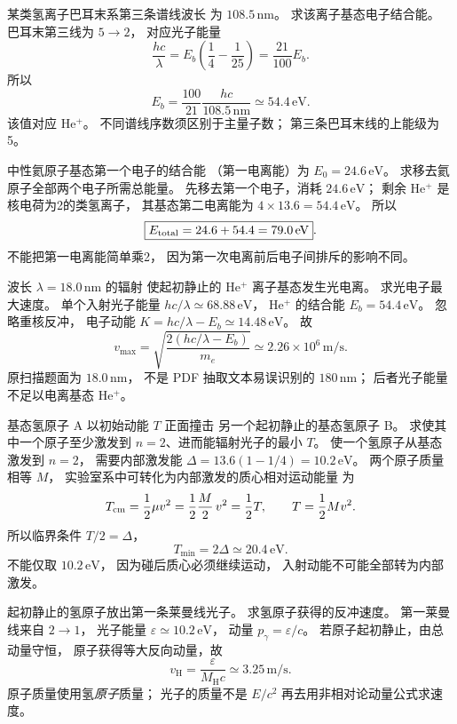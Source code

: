 某类氢离子巴耳末系第三条谱线波长
为 $108.5\,\mathrm{nm}$。
求该离子基态电子结合能。
\exsolution
巴耳末第三线为 $5\to2$，
对应光子能量
\[
 \frac{hc}{\lambda}
 =E_b\left(\frac14-\frac1{25}\right)
 =\frac{21}{100}E_b.
\]
所以
\[
 \boxed{E_b=\frac{100}{21}
 \frac{hc}{108.5\,\mathrm{nm}}
 \simeq54.4\,\mathrm{eV}}.
\]
该值对应 He$^+$。
\excheck 不同谱线序数须区别于主量子数；
第三条巴耳末线的上能级为5。

中性氦原子基态第一个电子的结合能
（第一电离能）为
$E_0=24.6\,\mathrm{eV}$。
求移去氦原子全部两个电子所需总能量。
\exsolution
先移去第一个电子，消耗
$24.6\,\mathrm{eV}$；
剩余 He$^+$ 是核电荷为2的类氢离子，
其基态第二电离能为
$4\times13.6=54.4\,\mathrm{eV}$。
所以
\[
 \boxed{E_{\rm total}=24.6+54.4
 =79.0\,\mathrm{eV}}.
\]
\excheck 不能把第一电离能简单乘2，
因为第一次电离前后电子间排斥的影响不同。

波长 $\lambda=18.0\,\mathrm{nm}$ 的辐射
使起初静止的 He$^+$ 离子基态发生光电离。
求光电子最大速度。
\exsolution
单个入射光子能量
$hc/\lambda\simeq68.88\,\mathrm{eV}$，
He$^+$ 的结合能 $E_b=54.4\,\mathrm{eV}$。
忽略重核反冲，
电子动能
$K=hc/\lambda-E_b\simeq14.48\,\mathrm{eV}$。
故
\[
 \boxed{v_{\max}=
 \sqrt{\frac{2(hc/\lambda-E_b)}{m_e}}
 \simeq2.26\times10^6\,\mathrm{m/s}}.
\]
\excheck 原扫描题面为 \textbf{$18.0\,\mathrm{nm}$}，
不是 PDF 抽取文本易误识别的 $180\,\mathrm{nm}$；
后者光子能量不足以电离基态 He$^+$。

基态氢原子 A 以初始动能 $T$ 正面撞击
另一个起初静止的基态氢原子 B。
求使其中一个原子至少激发到
$n=2$、进而能辐射光子的最小 $T$。
\exsolution
使一个氢原子从基态激发到 $n=2$，
需要内部激发能
$\Delta=13.6(1-1/4)=10.2\,\mathrm{eV}$。
两个原子质量相等 $M$，
实验室系中可转化为内部激发的质心相对运动能量
为
\[
 T_{\rm cm}=\frac12\mu v^2
 =\frac12\frac M2\,v^2
 =\frac12T,\qquad T=\frac12Mv^2.
\]
所以临界条件 $T/2=\Delta$，
\[
 \boxed{T_{\min}=2\Delta\simeq20.4\,\mathrm{eV}}.
\]
\excheck 不能仅取 $10.2\,\mathrm{eV}$，
因为碰后质心必须继续运动，
入射动能不可能全部转为内部激发。

起初静止的氢原子放出第一条莱曼线光子。
求氢原子获得的反冲速度。
\exsolution
第一莱曼线来自 $2\to1$，
光子能量
$\varepsilon\simeq10.2\,\mathrm{eV}$，
动量 $p_\gamma=\varepsilon/c$。
若原子起初静止，由总动量守恒，
原子获得等大反向动量，故
\[
 \boxed{v_{\mathrm H}=
 \frac{\varepsilon}{M_{\mathrm H}c}
 \simeq3.25\,\mathrm{m/s}}.
\]
\excheck 原子质量使用氢\emph{原子}质量；
光子的质量不是 $E/c^2$ 再去用非相对论动量公式求速度。

